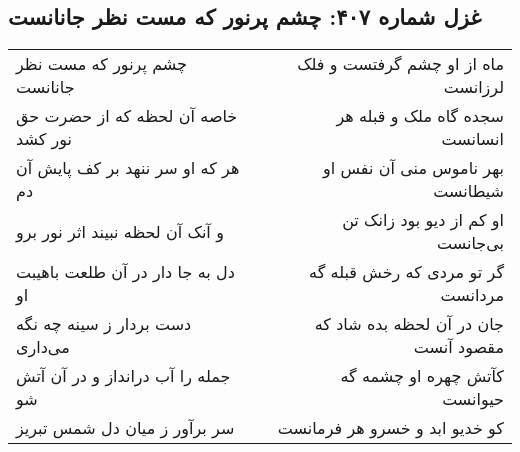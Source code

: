 \begin{center}
\section*{غزل شماره ۴۰۷: چشم پرنور که مست نظر جانانست}
\label{sec:0407}
\begin{longtable}{l p{0.5cm} r}
چشم پرنور که مست نظر جانانست
&&
ماه از او چشم گرفتست و فلک لرزانست
\\
خاصه آن لحظه که از حضرت حق نور کشد
&&
سجده گاه ملک و قبله هر انسانست
\\
هر که او سر ننهد بر کف پایش آن دم
&&
بهر ناموس منی آن نفس او شیطانست
\\
و آنک آن لحظه نبیند اثر نور برو
&&
او کم از دیو بود زانک تن بی‌جانست
\\
دل به جا دار در آن طلعت باهیبت او
&&
گر تو مردی که رخش قبله گه مردانست
\\
دست بردار ز سینه چه نگه می‌داری
&&
جان در آن لحظه بده شاد که مقصود آنست
\\
جمله را آب درانداز و در آن آتش شو
&&
کآتش چهره او چشمه گه حیوانست
\\
سر برآور ز میان دل شمس تبریز
&&
کو خدیو ابد و خسرو هر فرمانست
\\
\end{longtable}
\end{center}
